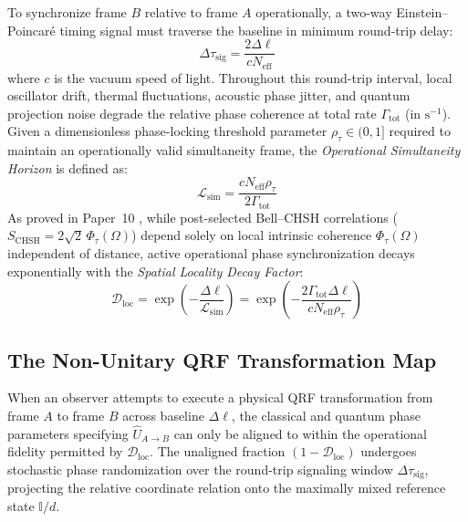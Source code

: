 \documentclass[11pt,a4paper]{article}
\begin{document}
To synchronize frame $B$ relative to frame $A$ operationally, a two-way Einstein--Poincaré timing signal must traverse the baseline in minimum round-trip delay:
\begin{equation}
    \Delta\tau_{\mathrm{sig}} = \frac{2 \Delta\ell}{c N_{\mathrm{eff}}}
    \label{eq:roundtrip}
\end{equation}
where $c$ is the vacuum speed of light. Throughout this round-trip interval, local oscillator drift, thermal fluctuations, acoustic phase jitter, and quantum projection noise degrade the relative phase coherence at total rate $\Gamma_{\mathrm{tot}}$ (in $\mathrm{s}^{-1}$). Given a dimensionless phase-locking threshold parameter $\rho_\tau \in (0, 1]$ required to maintain an operationally valid simultaneity frame, the \textit{Operational Simultaneity Horizon} is defined as:
\begin{equation}
    \mathcal{L}_{\mathrm{sim}} = \frac{c N_{\mathrm{eff}} \rho_\tau}{2 \Gamma_{\mathrm{tot}}}
    \label{eq:horizon}
\end{equation}
As proved in Paper~10 \cite{damasio_p10}, while post-selected Bell--CHSH correlations ($S_{\mathrm{CHSH}} = 2\sqrt{2}\,\Phi_\tau(\Omega)$) depend solely on local intrinsic coherence $\Phi_\tau(\Omega)$ independent of distance, active operational phase synchronization decays exponentially with the \textit{Spatial Locality Decay Factor}:
\begin{equation}
    \mathcal{D}_{\mathrm{loc}} = \exp\left(-\frac{\Delta\ell}{\mathcal{L}_{\mathrm{sim}}}\right) = \exp\left(-\frac{2 \Gamma_{\mathrm{tot}} \Delta\ell}{c N_{\mathrm{eff}} \rho_\tau}\right)
    \label{eq:dloc}
\end{equation}

\subsection{The Non-Unitary QRF Transformation Map}

When an observer attempts to execute a physical QRF transformation from frame $A$ to frame $B$ across baseline $\Delta\ell$, the classical and quantum phase parameters specifying $\hat{U}_{A \to B}$ can only be aligned to within the operational fidelity permitted by $\mathcal{D}_{\mathrm{loc}}$. The unaligned fraction $(1 - \mathcal{D}_{\mathrm{loc}})$ undergoes stochastic phase randomization over the round-trip signaling window $\Delta\tau_{\mathrm{sig}}$, projecting the relative coordinate relation onto the maximally mixed reference state $\mathbb{I}/d$.
\end{document}
